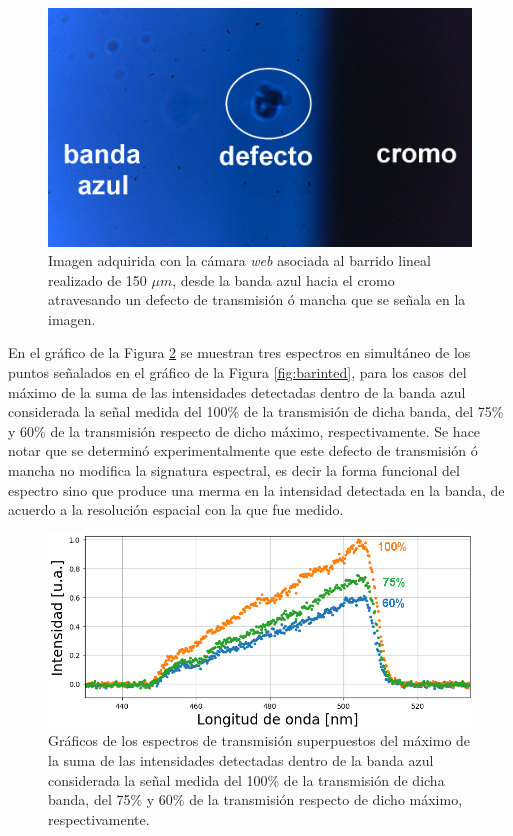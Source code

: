  \begin{figure}[H]
	\centering
	\includegraphics[width=1.0\textwidth]{Figs/microespectrometro/barridoenzdefecto.png}
	\caption{Imagen adquirida con la cámara \textit{web} asociada al barrido lineal realizado de 150 $\mu m$, desde la banda azul hacia el cromo atravesando un defecto de transmisión ó mancha que se señala en la imagen.}
	\label{fig:batod}
\end{figure}

En el gráfico de la Figura \ref{fig:merrmmin} se muestran tres espectros en simultáneo de los puntos señalados en el gráfico de la Figura \ref{fig:barinted}, para los casos del máximo de la suma de las intensidades detectadas dentro de la banda azul considerada la señal medida del 100\% de la transmisión de dicha banda, del 75\% y 60\% de la transmisión respecto de dicho máximo, respectivamente. Se hace notar que se determinó experimentalmente que este defecto de transmisión ó mancha no modifica la signatura espectral, es decir la forma funcional del espectro sino que produce una merma en la intensidad detectada en la banda, de acuerdo a la resolución espacial con la que fue medido. 

 \begin{figure}[H]
	\centering
	\includegraphics[width=1.0\textwidth]{Figs/microespectrometro/variacionintensidaddefecto.png}
	\caption{Gráficos de los espectros de transmisión superpuestos del máximo de la suma de las intensidades detectadas dentro de la banda azul considerada la señal medida del 100\% de la transmisión de dicha banda, del 75\% y 60\% de la transmisión respecto de dicho máximo, respectivamente. }
	\label{fig:merrmmin}
\end{figure}


